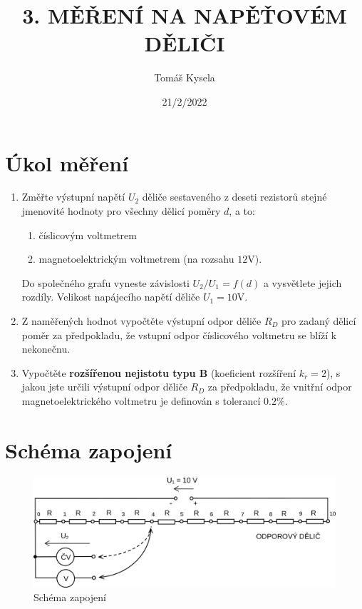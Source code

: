 \documentclass{article}
\title{\textbf{3. MĚŘENÍ NA NAPĚŤOVÉM DĚLIČI}}
\author{Tomáš Kysela}
\date{21/2/2022}
\begin{document}
\maketitle
\thispagestyle{empty}

\section{Úkol měření}
\begin{enumerate}
	\item Změřte výstupní napětí $U_2$ děliče sestaveného z deseti rezistorů stejné jmenovité hodnoty pro všechny dělicí poměry $d$, a to:
	      \begin{enumerate}
		      \item číslicovým voltmetrem
		      \item magnetoelektrickým voltmetrem (na rozsahu $12 \si{\volt}$).
	      \end{enumerate}
	      Do společného grafu vyneste závislosti $U_2 /U_1 = f(d)$ a vysvětlete jejich rozdíly. Velikost napájecího napětí děliče $U_1 = 10 \si{\volt}$.

	\item Z naměřených hodnot vypočtěte výstupní odpor děliče $R_D$ pro zadaný dělicí poměr za předpokladu, že vstupní odpor číslicového voltmetru se blíží k nekonečnu.

	\item Vypočtěte \textbf{rozšířenou nejistotu typu B} (koeficient rozšíření $k_r = 2$), s jakou jste určili výstupní odpor děliče $R_D$ za předpokladu, že vnitřní odpor magnetoelektrického voltmetru je definován s tolerancí $0.2\%$.
\end{enumerate}
\section{Schéma zapojení}
\begin{figure}[htp]
	\centering
	\includegraphics[scale=1.00]{LAB3.png}
	\caption{Schéma zapojení}
\end{figure}
\end{document}
